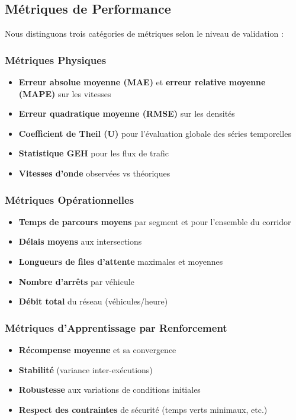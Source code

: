 \subsection{Métriques de Performance}
\label{subsec:metriques_performance}

Nous distinguons trois catégories de métriques selon le niveau de validation :

\subsubsection{Métriques Physiques}
\begin{itemize}
  \item \textbf{Erreur absolue moyenne (MAE)} et \textbf{erreur relative moyenne (MAPE)} sur les vitesses
  \item \textbf{Erreur quadratique moyenne (RMSE)} sur les densités
  \item \textbf{Coefficient de Theil (U)} pour l'évaluation globale des séries temporelles
  \item \textbf{Statistique GEH} pour les flux de trafic
  \item \textbf{Vitesses d'onde} observées vs théoriques
\end{itemize}

\subsubsection{Métriques Opérationnelles}
\begin{itemize}
  \item \textbf{Temps de parcours moyens} par segment et pour l'ensemble du corridor
  \item \textbf{Délais moyens} aux intersections
  \item \textbf{Longueurs de files d'attente} maximales et moyennes
  \item \textbf{Nombre d'arrêts} par véhicule
  \item \textbf{Débit total} du réseau (véhicules/heure)
\end{itemize}

\subsubsection{Métriques d'Apprentissage par Renforcement}
\begin{itemize}
  \item \textbf{Récompense moyenne} et sa convergence
  \item \textbf{Stabilité} (variance inter-exécutions)
  \item \textbf{Robustesse} aux variations de conditions initiales
  \item \textbf{Respect des contraintes} de sécurité (temps verts minimaux, etc.)
\end{itemize}

